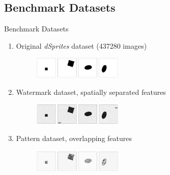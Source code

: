 \documentclass[German, aspectratio=169]{beamer}
\begin{document}
\subsection{Benchmark Datasets}
\begin{frame}{Benchmark Datasets}
    \centering
    \begin{enumerate}\addtocounter{enumi}{-1}
        \item Original \textit{dSprites} dataset \cite{dsprites17}  (437280 images)\\
              \begin{figure}
                  \centering
                  \includegraphics[width=0.4\textwidth]{images/examples_datasets_1.png}
              \end{figure}
              \pause
        \item Watermark dataset, spatially separated features \\
              \begin{figure}
                  \centering
                  \includegraphics[width=0.4\textwidth]{images/examples_datasets_2.png}
              \end{figure}
              \pause
        \item Pattern dataset, overlapping features\\
              \begin{figure}
                  \centering
                  \includegraphics[width=0.4\textwidth]{images/examples_datasets_3.png}
              \end{figure}
    \end{enumerate}
\end{frame}
\end{document}
